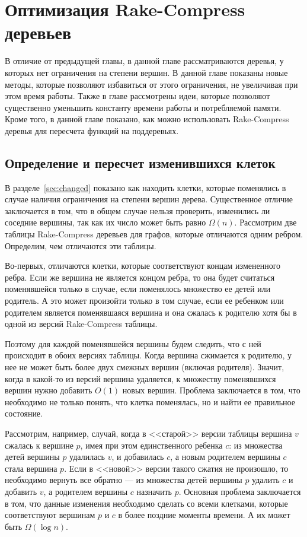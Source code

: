 \chapter{Оптимизация Rake-Compress деревьев}

В отличие от предыдущей главы, в данной главе рассматриваются деревья, у которых нет ограничения на степени вершин. 
В данной главе показаны новые методы, которые позволяют избавиться от этого ограничения, не увеличивая при этом время работы.
Также в главе рассмотрены идеи, которые позволяют существенно уменьшить константу времени работы и потребляемой памяти.
Кроме того, в данной главе показано, как можно использовать Rake-Compress деревья для пересчета функций на поддеревьях.

\FloatBarrier
\section{Определение и пересчет изменившихся клеток}
В разделе~\ref{sec:changed} показано как находить клетки, которые поменялись в случае наличия ограничения на степени вершин дерева.
Существенное отличие заключается в том, что в общем случае нельзя проверить, изменились ли соседние вершины, так как их число может быть равно $\Omega(n)$.
Рассмотрим две таблицы Rake-Compress деревьев для графов, которые отличаются одним ребром. Определим, чем отличаются эти таблицы.

Во-первых, отличаются клетки, которые соответствуют концам измененного ребра. 
Если же вершина не является концом ребра, то она будет считаться поменявшейся только в случае, если поменялось множество ее детей или родитель. 
А это может произойти только в том случае, если ее ребенком или родителем является поменявшаяся вершина и она сжалась к родителю хотя бы в одной из версий Rake-Compress таблицы.

Поэтому для каждой поменявшейся вершины будем следить, что с ней происходит в обоих версиях таблицы. 
Когда вершина сжимается к родителю, у нее не может быть более двух смежных вершин (включая родителя).
Значит, когда в какой-то из версий вершина удаляется, к множеству поменявшихся вершин нужно добавить $O(1)$ новых вершин.
Проблема заключается в том, что необходимо не только понять, что клетка поменялась, но и найти ее правильное состояние. 

Рассмотрим, например, случай, когда в <<старой>> версии таблицы вершина $v$ сжалась к вершине $p$, имея при этом единственного ребенка $c$: 
из множества детей вершины $p$ удалилась $v$, и добавилась $c$, а новым родителем вершины $c$ стала вершина $p$. 
Если в <<новой>> версии такого сжатия не произошло, то необходимо вернуть все обратно --- из множества детей вершины $p$ удалить $c$ и добавить $v$, а родителем вершины $c$ назначить $p$.
Основная проблема заключается в том, что данные изменения необходимо сделать со всеми клетками, которые соответствуют вершинам $p$ и $c$ в более поздние моменты времени. А их может быть $\Omega(\log n)$.

